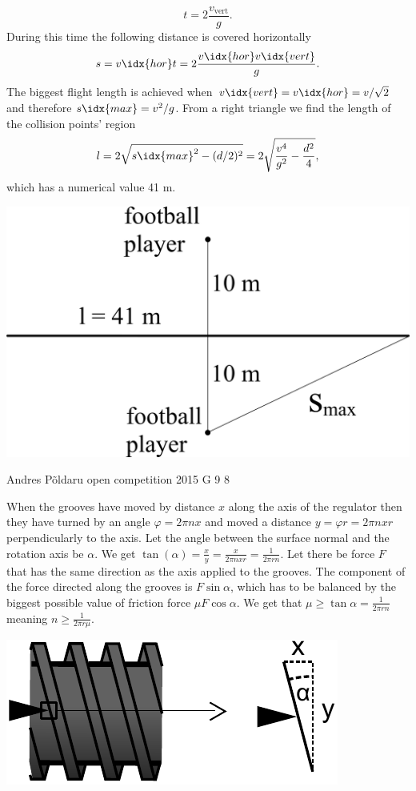 \documentclass[11pt]{article}
\begin{document}
{\[
t=2\frac{v_{\mathrm{vert}}}{g}.
\] 
During this time the following distance is covered horizontally
\[
s=v\idx{hor}t=2\frac{v\idx{hor}v\idx{vert}}{g}. 
\] 
The biggest flight length is achieved when $v\idx{vert}=v\idx{hor}=v / \sqrt{2}$ and therefore $s\idx{max}=v^2 / g$. From a right triangle we find the length of the collision points’ region
\[
l=2\sqrt{{s\idx{max}}^2-(d/2)^2}=2\sqrt{\frac{v^4}{g^2}-\frac{d^2}{4}},
\] 
which has a numerical value 41 m. 
\begin{center}
\includegraphics[width=0.5\linewidth]{2013-v3g-09-jalgpallurid_ing}
\end{center}
\fi
}

{Andres Põldaru} %
{open competition} %
{2015} %
{G 9} %
{8} %
{

\ifEngSolution
When the grooves have moved by distance $x$ along the axis of the regulator then they have turned by an angle $\varphi=2\pi nx$ and moved a distance $y=\varphi r=2\pi nxr$ perpendicularly to the axis. Let the angle between the surface normal and the rotation axis be $\alpha$. We get $\tan(\alpha)=\frac{x}{y}=\frac{x}{2\pi nxr}=\frac{1}{2\pi rn}$. Let there be force $F$ that has the same direction as the axis applied to the grooves. The component of the force directed along the grooves is $F\sin\alpha$, which has to be balanced by the biggest possible value of friction force $\mu F\cos\alpha$. We get that $\mu\geq\tan\alpha=\frac{1}{2\pi rn}$ meaning $n\ge\frac{1}{2\pi r\mu}$.
\begin{center}
\includegraphics[width=0.5\linewidth]{2015-lahg-09-mutriv6ti_lahendus}
\end{center}
\fi
}
\end{document}
